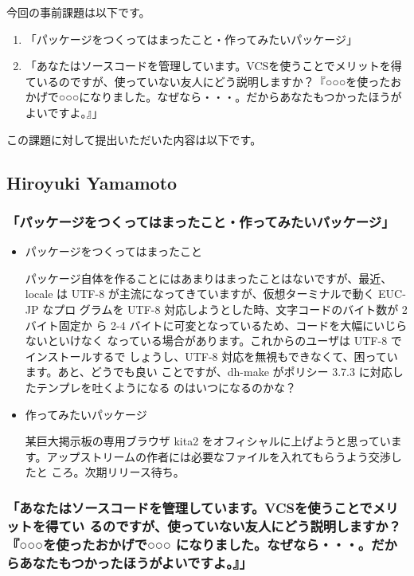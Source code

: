 \documentclass[mingoth,a4paper]{jsarticle}
\begin{document}

今回の事前課題は以下です。

\begin{enumerate}
 \item 「パッケージをつくってはまったこと・作ってみたいパッケージ」
 \item 「あなたはソースコードを管理しています。VCSを使うことでメリットを得ているのですが、使っていない友人にどう説明しますか？『○○○を使ったおかげで○○○になりました。なぜなら・・・。だからあなたもつかったほうがよいですよ。』」
\end{enumerate}

この課題に対して提出いただいた内容は以下です。

\subsection{Hiroyuki Yamamoto}

\subsubsection{「パッケージをつくってはまったこと・作ってみたいパッケージ」}

\begin{itemize}
 \item  パッケージをつくってはまったこと

 パッケージ自体を作ることにはあまりはまったことはないですが、最近、locale
 は UTF-8 が主流になってきていますが、仮想ターミナルで動く EUC-JP なプロ
 グラムを UTF-8 対応しようとした時、文字コードのバイト数が 2 バイト固定か
 ら 2-4 バイトに可変となっているため、コードを大幅にいじらないといけなく
 なっている場合があります。これからのユーザは UTF-8 でインストールするで
 しょうし、UTF-8 対応を無視もできなくて、困っています。あと、どうでも良い
 ことですが、dh-make がポリシー 3.7.3 に対応したテンプレを吐くようになる
 のはいつになるのかな？
 \item  作ってみたいパッケージ

 某巨大掲示板の専用ブラウザ kita2 をオフィシャルに上げようと思っていま
 す。アップストリームの作者には必要なファイルを入れてもらうよう交渉したと
 ころ。次期リリース待ち。
\end{itemize}

\subsubsection{「あなたはソースコードを管理しています。VCSを使うことでメリットを得てい
るのですが、使っていない友人にどう説明しますか？『○○○を使ったおかげで○○○
になりました。なぜなら・・・。だからあなたもつかったほうがよいですよ。』」}
\end{document}
